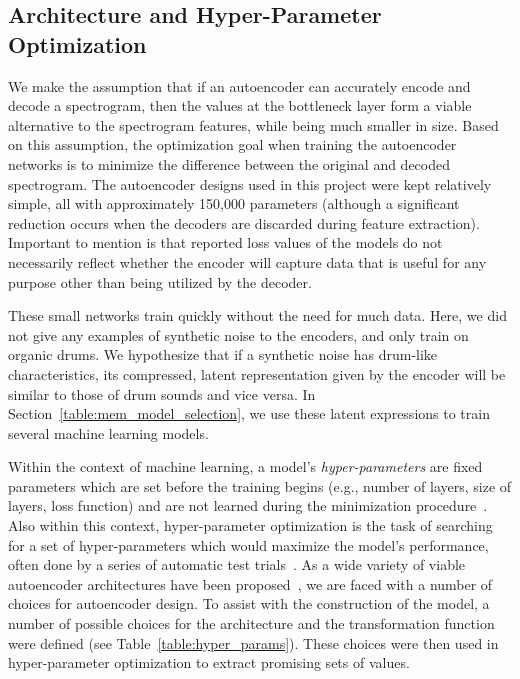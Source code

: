 \documentclass[\main/thesis.tex]{subfiles}
\begin{document}
\subsection{Architecture and Hyper-Parameter Optimization}
We make the assumption that if an autoencoder can accurately encode and decode a spectrogram, then the values at the bottleneck layer form a viable alternative to the spectrogram features, while being much smaller in size. Based on this assumption, the optimization goal when training the autoencoder networks is to minimize the difference between the original and decoded spectrogram.  The autoencoder designs used in this project were kept relatively simple, all with approximately 150,000 parameters (although a significant reduction occurs when the decoders are discarded during feature extraction). Important to mention is that reported loss values of the models do not necessarily reflect whether the encoder will capture data that is useful for any purpose other than being utilized by the decoder. 

These small networks train quickly without the need for much data. Here, we did not give any examples of synthetic noise to the encoders, and only train on organic drums. We hypothesize that if a synthetic noise has drum-like characteristics, its compressed, latent representation given by the encoder will be similar to those of drum sounds and vice versa. In Section~\ref{table:mem_model_selection}, we use these latent expressions to train several machine learning models.

Within the context of machine learning, a model's \emph{hyper-parameters} are fixed parameters which are set before the training begins (e.g., number of layers, size of layers, loss function) and are not learned during the minimization procedure~\cite{bengio2000gradient}. Also within this context, hyper-parameter optimization is the task of searching for a set of hyper-parameters which would maximize the model's performance, often done by a series of automatic test trials~\cite{bengio2000gradient,bergstra2011algorithms,bergstra2012random}. As a wide variety of viable autoencoder architectures have been proposed~\cite{aouameur2019neural,esling2018generative,gensler2016deep,zhang2016facing,pu2016variational}, we are faced with a number of choices for autoencoder design. To assist with the construction of the model, a number of possible choices for the architecture and the transformation function were defined (see Table~\ref{table:hyper_params}). These choices were then used in hyper-parameter optimization to extract promising sets of values. 
\end{document}
